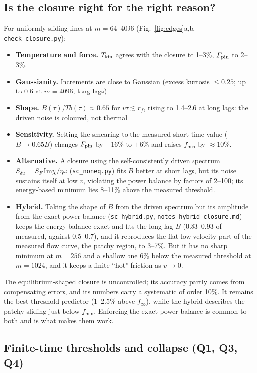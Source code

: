 \documentclass[10pt,a4paper]{article}
\begin{document}
\subsection{Is the closure right for the right reason?}

For uniformly sliding lines at $m=64$--4096 (Fig.~\ref{fig:edges}a,b, \texttt{check\_closure.py}):
\begin{itemize}
\item \textbf{Temperature and force.} $T_{\rm kin}$ agrees with the closure to 1--3\%, $F_{\rm pin}$ to 2--3\%.
\item \textbf{Gaussianity.} Increments are close to Gaussian (excess kurtosis $\le0.25$; up to $0.6$ at $m=4096$, long lags).
\item \textbf{Shape.} $B(\tau)/Tb(\tau)\approx0.65$ for $v\tau\lesssim r_f$, rising to 1.4--2.6 at long lags: the driven noise is coloured, not thermal.
\item \textbf{Sensitivity.} Setting the smearing to the measured short-time value ($B\to0.65B$) changes $F_{\rm pin}$ by $-16\%$ to $+6\%$ and raises $f_{\min}$ by $\approx10\%$.
\item \textbf{Alternative.} A closure using the self-consistently driven spectrum $S_{\delta u}=S_F\,\mathrm{Im}\chi/\eta\omega$ (\texttt{sc\_noneq.py}) fits $B$ better at short lags, but its noise sustains itself at low $v$, violating the power balance by factors of 2--100; its energy-based minimum lies 8--11\% above the measured threshold.
\item \textbf{Hybrid.} Taking the shape of $B$ from the driven spectrum but its amplitude from the exact power balance (\texttt{sc\_hybrid.py}, \texttt{notes\_hybrid\_closure.md}) keeps the energy balance exact and fits the long-lag $B$ (0.83--0.93 of measured, against 0.5--0.7), and it reproduces the flat low-velocity part of the measured flow curve, the patchy region, to 3--7\%. But it has no sharp minimum at $m=256$ and a shallow one 6\% below the measured threshold at $m=1024$, and it keeps a finite ``hot'' friction as $v\to0$.
\end{itemize}
The equilibrium-shaped closure is uncontrolled; its accuracy partly comes from compensating errors, and its numbers carry a systematic of order 10\%. It remains the best threshold predictor (1--2.5\% above $f_\infty$), while the hybrid describes the patchy sliding just below $f_{\min}$. Enforcing the exact power balance is common to both and is what makes them work.

\subsection{Finite-time thresholds and collapse (Q1, Q3, Q4)}
\end{document}
